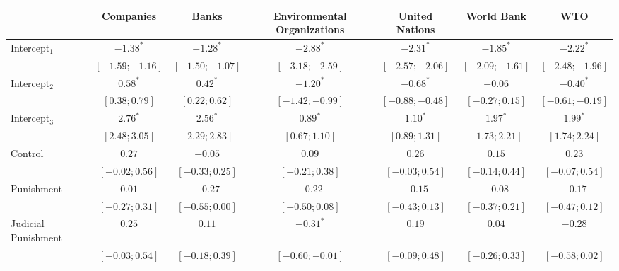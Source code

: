\usepackage{threeparttable}

\begin{table}[h]
\begin{center}
\begin{threeparttable}
\begin{tabular}{l c c c c c c}
\hline
 & Companies & Banks & Environmental Organizations & United Nations & World Bank & WTO \\
\hline
Intercept$_1$       & $-1.38^{*}$       & $-1.28^{*}$       & $-2.88^{*}$       & $-2.31^{*}$       & $-1.85^{*}$       & $-2.22^{*}$       \\
                    & $ [-1.59; -1.16]$ & $ [-1.50; -1.07]$ & $ [-3.18; -2.59]$ & $ [-2.57; -2.06]$ & $ [-2.09; -1.61]$ & $ [-2.48; -1.96]$ \\
Intercept$_2$       & $0.58^{*}$        & $0.42^{*}$        & $-1.20^{*}$       & $-0.68^{*}$       & $-0.06$           & $-0.40^{*}$       \\
                    & $ [ 0.38;  0.79]$ & $ [ 0.22;  0.62]$ & $ [-1.42; -0.99]$ & $ [-0.88; -0.48]$ & $ [-0.27;  0.15]$ & $ [-0.61; -0.19]$ \\
Intercept$_3$       & $2.76^{*}$        & $2.56^{*}$        & $0.89^{*}$        & $1.10^{*}$        & $1.97^{*}$        & $1.99^{*}$        \\
                    & $ [ 2.48;  3.05]$ & $ [ 2.29;  2.83]$ & $ [ 0.67;  1.10]$ & $ [ 0.89;  1.31]$ & $ [ 1.73;  2.21]$ & $ [ 1.74;  2.24]$ \\
Control             & $0.27$            & $-0.05$           & $0.09$            & $0.26$            & $0.15$            & $0.23$            \\
                    & $ [-0.02;  0.56]$ & $ [-0.33;  0.25]$ & $ [-0.21;  0.38]$ & $ [-0.03;  0.54]$ & $ [-0.14;  0.44]$ & $ [-0.07;  0.54]$ \\
Punishment          & $0.01$            & $-0.27$           & $-0.22$           & $-0.15$           & $-0.08$           & $-0.17$           \\
                    & $ [-0.27;  0.31]$ & $ [-0.55;  0.00]$ & $ [-0.50;  0.08]$ & $ [-0.43;  0.13]$ & $ [-0.37;  0.21]$ & $ [-0.47;  0.12]$ \\
Judicial Punishment & $0.25$            & $0.11$            & $-0.31^{*}$       & $0.19$            & $0.04$            & $-0.28$           \\
                    & $ [-0.03;  0.54]$ & $ [-0.18;  0.39]$ & $ [-0.60; -0.01]$ & $ [-0.09;  0.48]$ & $ [-0.26;  0.33]$ & $ [-0.58;  0.02]$ \\

\end{tabular}
\end{threeparttable}
\end{center}
\end{table}
